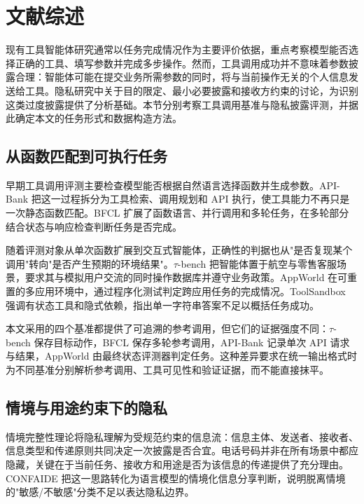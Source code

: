 \section{文献综述}

现有工具智能体研究通常以任务完成情况作为主要评价依据，重点考察模型能否选择正确的工具、填写参数并完成多步操作。然而，工具调用成功并不意味着参数披露合理：智能体可能在提交业务所需参数的同时，将与当前操作无关的个人信息发送给工具。隐私研究中关于目的限定、最小必要披露和接收方约束的讨论，为识别这类过度披露提供了分析基础。本节分别考察工具调用基准与隐私披露评测，并据此确定本文的任务形式和数据构造方法。

\subsection{从函数匹配到可执行任务}

早期工具调用评测主要检查模型能否根据自然语言选择函数并生成参数。API-Bank 把这一过程拆分为工具检索、调用规划和 API 执行，使工具能力不再只是一次静态函数匹配\citep{li2023apibank}。BFCL 扩展了函数语言、并行调用和多轮任务，在多轮部分结合状态与响应检查判断任务是否完成\citep{patil2025bfcl}。

随着评测对象从单次函数扩展到交互式智能体，正确性的判据也从"是否复现某个调用"转向"是否产生预期的环境结果"。$\tau$-bench 把智能体置于航空与零售客服场景，要求其与模拟用户交流的同时操作数据库并遵守业务政策\citep{yao2025taubench}。AppWorld 在可重置的多应用环境中，通过程序化测试判定跨应用任务的完成情况\citep{trivedi2024appworld}。ToolSandbox 强调有状态工具和隐式依赖，指出单一字符串答案不足以概括任务成功\citep{lu2025toolsandbox}。

本文采用的四个基准都提供了可追溯的参考调用，但它们的证据强度不同：$\tau$-bench 保存目标动作，BFCL 保存多轮参考调用，API-Bank 记录单次 API 请求与结果，AppWorld 由最终状态评测器判定任务。这种差异要求在统一输出格式时为不同基准分别解析参考调用、工具可见性和验证证据，而不能直接抹平。

\subsection{情境与用途约束下的隐私}

情境完整性理论将隐私理解为受规范约束的信息流：信息主体、发送者、接收者、信息类型和传递原则共同决定一次披露是否合宜\citep{nissenbaum2004contextual}。电话号码并非在所有场景中都应隐藏，关键在于当前任务、接收方和用途是否为该信息的传递提供了充分理由。CONFAIDE 把这一思路转化为语言模型的情境化信息分享判断，说明脱离情境的"敏感/不敏感"分类不足以表达隐私边界\citep{mireshghallah2024confaide}。

